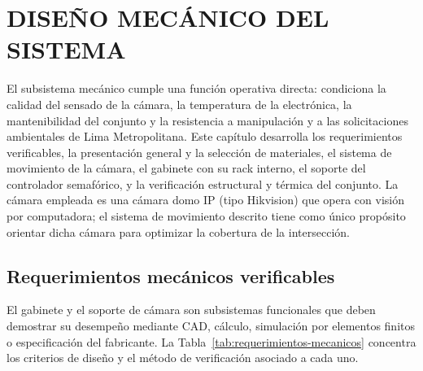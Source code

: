 \chapter{DISEÑO MECÁNICO DEL SISTEMA}\label{cap:diseno-mecanico}

El subsistema mecánico cumple una función operativa directa: condiciona la calidad del sensado de la cámara, la temperatura de la electrónica, la mantenibilidad del conjunto y la resistencia a manipulación y a las solicitaciones ambientales de Lima Metropolitana. Este capítulo desarrolla los requerimientos verificables, la presentación general y la selección de materiales, el sistema de movimiento de la cámara, el gabinete con su rack interno, el soporte del controlador semafórico, y la verificación estructural y térmica del conjunto. La cámara empleada es una cámara domo IP (tipo Hikvision) que opera con visión por computadora; el sistema de movimiento descrito tiene como único propósito orientar dicha cámara para optimizar la cobertura de la intersección.

\section{Requerimientos mecánicos verificables}\label{sec:requerimientos-mecanicos}

El gabinete y el soporte de cámara son subsistemas funcionales que deben demostrar su desempeño mediante CAD, cálculo, simulación por elementos finitos o especificación del fabricante. La Tabla~\ref{tab:requerimientos-mecanicos} concentra los criterios de diseño y el método de verificación asociado a cada uno.

